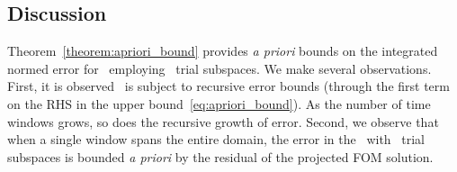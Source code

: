 \begin{comment}
Thus we have,
$$ \intSlabArg{n} \norm{ \stateROMSolArgt{n}{t} - \stateROMStarSolArgt{n}{t}} = \DeltaSlabArg{n} \errorArgt{n}{\timeStartArg{n}}.$$
Inserting the above into~\eqref{eq:boundtmp},
\begin{equation*}
\intSlabArg{n} \norm{\errorArgt{n}{t}} dt \le \DeltaSlabArg{n} \norm{\errorArgt{n}{\timeStartArg{n}}  }   + \lipshitzi \intSlabArg{n} \norm{ \resid(\stateFOMProjSolArgt{n}{t}) } dt.
\end{equation*}
\end{proof}
\end{comment}
\subsection{Discussion} 
Theorem~\ref{theorem:apriori_bound} provides \textit{a priori} bounds on the integrated normed error for \methodAcronym\ employing \spatialAcronym\ trial subspaces. We make several 
observations. First, it is observed \methodAcronym\ is subject to recursive error bounds (through the first term on the RHS in the upper bound~\eqref{eq:apriori_bound}). As the number of time windows grows, so does the recursive growth of error. Second, we observe that when a single window spans the entire domain, the error in the \methodAcronym\ with \spatialAcronym\ trial subspaces is bounded \textit{a priori} by the residual of the projected FOM solution. 
%

